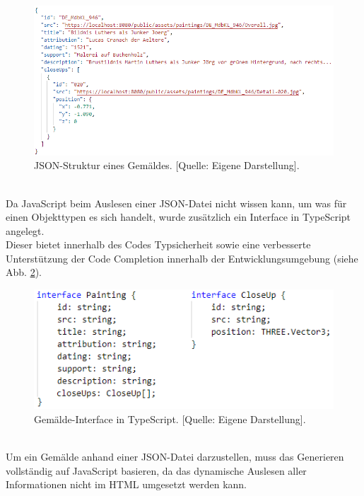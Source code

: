 \documentclass[a4paper,12pt,oneside]{article}
\begin{document}
        \begin{figure}[h]
          \centering
          \includegraphics[scale=0.8]{img/coding/json-aufbau1.png}
          \caption[JSON-Struktur eines Gemäldes.]{JSON-Struktur eines Gemäldes. [Quelle: Eigene Darstellung].}
          \label{fig:json-aufbau1}
        \end{figure} \\
        Da JavaScript beim Auslesen einer JSON-Datei nicht wissen kann,
        um was für einen Objekttypen es sich handelt, wurde zusätzlich ein
        Interface in TypeScript angelegt. \\
        Dieser bietet innerhalb des Codes Typsicherheit sowie eine
        verbesserte Unterstützung der Code Completion innerhalb der
        Entwicklungsumgebung (siehe Abb. \ref{fig:painting-type1}).
        \begin{figure}[h]
          \centering
          \includegraphics{img/coding/painting-type1.png}
          \caption[Gemälde-Interface in TypeScript.]{Gemälde-Interface in TypeScript. [Quelle: Eigene Darstellung].}
          \label{fig:painting-type1}
        \end{figure} \\
        Um ein Gemälde anhand einer JSON-Datei darzustellen,
        muss das Generieren vollständig auf JavaScript
        basieren, da das dynamische Auslesen aller Informationen
        nicht im HTML umgesetzt werden kann. 
\end{document}
